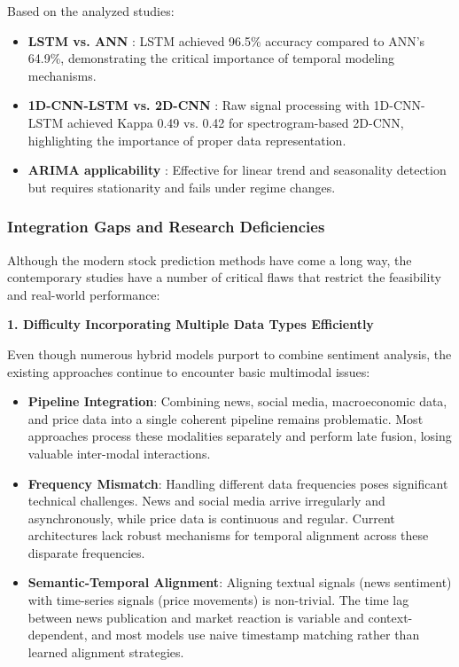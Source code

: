 Based on the analyzed studies:
\begin{itemize}
    \item \textbf{LSTM vs. ANN} \cite{machinefailure2024}: LSTM achieved 96.5\% accuracy compared to ANN's 64.9\%, demonstrating the critical importance of temporal modeling mechanisms.
    \item \textbf{1D-CNN-LSTM vs. 2D-CNN} \cite{eda2023}: Raw signal processing with 1D-CNN-LSTM achieved Kappa 0.49 vs. 0.42 for spectrogram-based 2D-CNN, highlighting the importance of proper data representation.
    \item \textbf{ARIMA applicability} \cite{supermarket2025}: Effective for linear trend and seasonality detection but requires stationarity and fails under regime changes.
\end{itemize}

\subsubsection{Integration Gaps and Research Deficiencies}

Although the modern stock prediction methods have come a long way, the contemporary studies have a number of critical flaws that restrict the feasibility and real-world performance:


\textbf{1. Difficulty Incorporating Multiple Data Types Efficiently}

Even though numerous hybrid models purport to combine sentiment analysis, the existing approaches continue to encounter basic multimodal issues:
\begin{itemize}
    \item \textbf{Pipeline Integration}: Combining news, social media, macroeconomic data, and price data into a single coherent pipeline remains problematic. Most approaches process these modalities separately and perform late fusion, losing valuable inter-modal interactions.
    
    \item \textbf{Frequency Mismatch}: Handling different data frequencies poses significant technical challenges. News and social media arrive irregularly and asynchronously, while price data is continuous and regular. Current architectures lack robust mechanisms for temporal alignment across these disparate frequencies.
    
    \item \textbf{Semantic-Temporal Alignment}: Aligning textual signals (news sentiment) with time-series signals (price movements) is non-trivial. The time lag between news publication and market reaction is variable and context-dependent, and most models use naive timestamp matching rather than learned alignment strategies.
\end{itemize}

